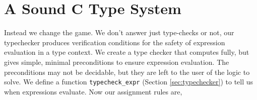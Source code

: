 \documentclass{puthesis}
\begin{document}





\section{A Sound C Type System}

Instead we change the game.  We don't answer just type-checks or not,
our typechecker produces verification conditions for the safety of
expression evaluation in a type context. We create a type checker that
computes fully, but gives simple, minimal preconditions to ensure
expression evaluation. The preconditions may not be decidable, but
they are left to the user of the logic to solve. We define a function
\lstinline|typecheck_expr| (Section \ref{sec:typechecker}) to tell us
when expressions evaluate.  Now our assignment rules are,
\end{document}
